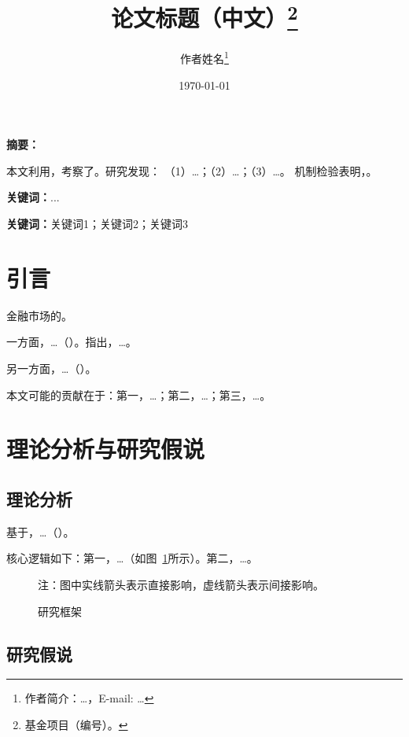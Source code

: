 \documentclass[lang=cn, aaffiliation={中国}]{ctexart}
\title{论文标题（中文）\thanks{基金项目（编号）。}}
\author{作者姓名\thanks{作者简介：\dots，E-mail: \dots}}
\date{\today}
\newenvironment{cnabstract}{%
    \par\textbf{摘要：}
}{\par\vspace{\baselineskip}\par\textbf{关键词：}...}
\begin{document}
\thispagestyle{empty}
\maketitle
\thispagestyle{fancy}

\begin{cnabstract}
    本文利用，考察了。研究发现：
    （1）\dots；（2）\dots；（3）\dots。
    机制检验表明，。
\end{cnabstract}

\textbf{关键词：}关键词1；关键词2；关键词3

\section{引言}
\label{sec:intro}

金融市场的。

一方面，\dots（\citealp{xxx}）。\citet{yyy}指出，\dots。

另一方面，\dots（\citealp{zzz}）。

本文可能的贡献在于：第一，\dots；第二，\dots；第三，\dots。

\section{理论分析与研究假说}
\label{sec:theory}

\subsection{理论分析}
\label{sec:theory:mech}

基于，\dots（\citealp{xxx}）。

核心逻辑如下：第一，\dots（如图~\ref{fig:framework}所示）。第二，\dots。

\begin{figure}[htbp]
    \centering
    \caption{研究框架}
    \label{fig:framework}
    \begin{minipage}{0.75\textwidth}\footnotesize
        注：图中实线箭头表示直接影响，虚线箭头表示间接影响。
    \end{minipage}
\end{figure}

\subsection{研究假说}
\label{sec:hypothesis}
\end{document}
